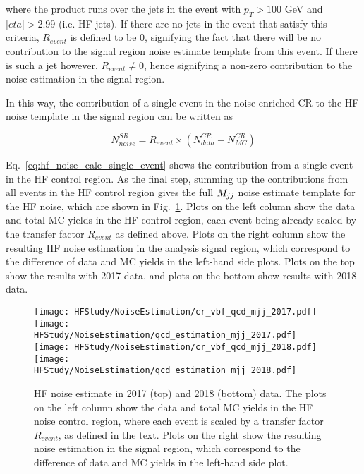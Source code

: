 where the product runs over the jets in the event with $p_T > 100$ GeV and $|eta| > 2.99$ (i.e. HF jets). If there are no
jets in the event that satisfy this criteria, $R_{event}$ is defined to be $0$, signifying the fact that there will be no contribution
to the signal region noise estimate template from this event. If there is such a jet however, $R_{event} \neq 0$, hence signifying
a non-zero contribution to the noise estimation in the signal region.

In this way, the contribution of a single event in the noise-enriched CR to the HF noise template in the signal region can be written as

\begin{equation}
    N_{noise}^{SR} = R_{event} \times (N_{data}^{CR} - N_{MC}^{CR})
    \label{eq:hf_noise_calc_single_event}
\end{equation}

Eq.~\ref{eq:hf_noise_calc_single_event} shows the contribution from a single event in the HF control region.
As the final step, summing up the contributions from all events in the HF control region gives the full $M_{jj}$ 
noise estimate template for the HF noise, which are shown in Fig.~\ref{fig:hf_estimation_mtr}.
Plots on the left column show the data and total MC
yields in the HF control region, each event being already scaled by the transfer factor 
$R_{event}$ as defined above. 
Plots on the right column show the resulting HF noise estimation in the analysis
signal region, which correspond to the difference of data and MC yields in the left-hand side plots.
Plots on the top show the results with 2017 data, and plots on the bottom show results with 2018 data.

\begin{figure}[h!]
    \centering
        \texttt{[image: HFStudy/NoiseEstimation/cr\_vbf\_qcd\_mjj\_2017.pdf]}
        \texttt{[image: HFStudy/NoiseEstimation/qcd\_estimation\_mjj\_2017.pdf]} \\ 
        \texttt{[image: HFStudy/NoiseEstimation/cr\_vbf\_qcd\_mjj\_2018.pdf]}
        \texttt{[image: HFStudy/NoiseEstimation/qcd\_estimation\_mjj\_2018.pdf]}
    \caption{HF noise estimate in 2017 (top) and 2018 (bottom) data. The plots on the left column show the data and total MC yields in the HF noise control region,
      where each event is scaled by a transfer factor $R_{event}$, as defined in the text. 
      Plots on the right show the resulting noise estimation in the signal region, which correspond to the difference of data and MC
      yields in the left-hand side plot.
    }
    \label{fig:hf_estimation_mtr}
\end{figure}

